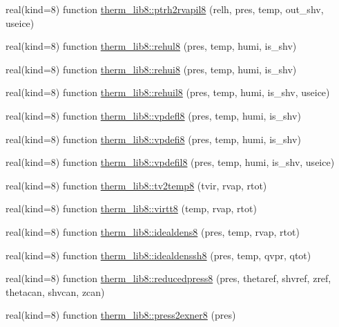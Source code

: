 \begin{DoxyCompactItemize}
\item 
real(kind=8) function \hyperlink{namespacetherm__lib8_a8ad59ba9abc05562f0c90d7ef6a8bca8}{therm\+\_\+lib8\+::ptrh2rvapil8} (relh, pres, temp, out\+\_\+shv, useice)
\item 
real(kind=8) function \hyperlink{namespacetherm__lib8_a00df68c843939c4d08f0e8ef99ad4fba}{therm\+\_\+lib8\+::rehul8} (pres, temp, humi, is\+\_\+shv)
\item 
real(kind=8) function \hyperlink{namespacetherm__lib8_aab9071671edac02a14988c3f5724aa51}{therm\+\_\+lib8\+::rehui8} (pres, temp, humi, is\+\_\+shv)
\item 
real(kind=8) function \hyperlink{namespacetherm__lib8_a51fbba130b3fc3a6cc1744aeb76a2b81}{therm\+\_\+lib8\+::rehuil8} (pres, temp, humi, is\+\_\+shv, useice)
\item 
real(kind=8) function \hyperlink{namespacetherm__lib8_ab166c98ec9b055545b3545d1816fd9bc}{therm\+\_\+lib8\+::vpdefl8} (pres, temp, humi, is\+\_\+shv)
\item 
real(kind=8) function \hyperlink{namespacetherm__lib8_a1f7ea92fca9ac1740028a6781997e12f}{therm\+\_\+lib8\+::vpdefi8} (pres, temp, humi, is\+\_\+shv)
\item 
real(kind=8) function \hyperlink{namespacetherm__lib8_a11c93be5459d6b6a5501cbd52977e6ab}{therm\+\_\+lib8\+::vpdefil8} (pres, temp, humi, is\+\_\+shv, useice)
\item 
real(kind=8) function \hyperlink{namespacetherm__lib8_ae028e7a977aa12e130948694af49c31d}{therm\+\_\+lib8\+::tv2temp8} (tvir, rvap, rtot)
\item 
real(kind=8) function \hyperlink{namespacetherm__lib8_a84cb0b0932922178e82afb8a5f9627ad}{therm\+\_\+lib8\+::virtt8} (temp, rvap, rtot)
\item 
real(kind=8) function \hyperlink{namespacetherm__lib8_a18ba1889218ff1cf51e4b8ec9c612f02}{therm\+\_\+lib8\+::idealdens8} (pres, temp, rvap, rtot)
\item 
real(kind=8) function \hyperlink{namespacetherm__lib8_a71a3a8a71ff6e3d11c6b604f495e5240}{therm\+\_\+lib8\+::idealdenssh8} (pres, temp, qvpr, qtot)
\item 
real(kind=8) function \hyperlink{namespacetherm__lib8_ad325dbfaa9ff36bd492b23150ffd2dc0}{therm\+\_\+lib8\+::reducedpress8} (pres, thetaref, shvref, zref, thetacan, shvcan, zcan)
\item 
real(kind=8) function \hyperlink{namespacetherm__lib8_affcedde7d4e3f1d858091ea47c58186f}{therm\+\_\+lib8\+::press2exner8} (pres)
\item 

\end{DoxyCompactItemize}
